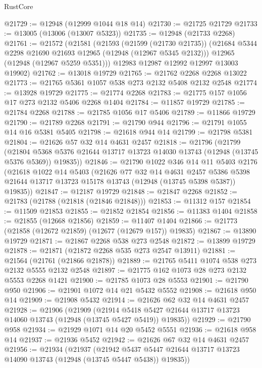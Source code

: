 \begin{lexlean}{RustCore}
\begin{coremodule}
@21729 := @12948 (@12999 @1044 @18 @14)
@21730 := @21725 @21729
@21733 := @13005 (@13006 (@13007 @5323))
@21735 := @12948 (@21733 @2268)
@21761 := @21572
    (@21581
      (@21593
        (@21599 (@21730 @21735))
        (@21684 @5344 @2298 @21690 @21693 @12965 (@12948 (@12967 @5345 @2132)))
        @12965
        (@12948 (@12967 @5259 @5351)))
      @12983
      @12987
      @12992
      @12997
      @13003
      @19902)
@21762 := @13018 @19729
@21765 := @21762 @2268 @2268 @13022
@21773 := @21765 @5361 @1057 @538 @273 @2132 @5408 @2132 @2548
@21774 := @13928 @19729
@21775 := @21774 @2268
@21783 := @21775 @157 @1056 @17 @273 @2132 @5406 @2268 @1404
@21784 := @11857 @19729
@21785 := @21784 @2268
@21788 := @21785 @1056 @17 @5406
@21789 := @11866 @19729
@21790 := @21789 @2268
@21791 := @21790 @944
@21796 := @21791 @1055 @14 @16 @5381 @5405
@21798 := @21618 @944 @14
@21799 := @21798 @5381
@21804 := @21626 @57 @32 @14 @4631 @2457
@21818 := @21796
    (@21799
      (@21804 @5368 @5376 @21644 @13717 @13723 @14030 @13743 (@12948 (@13745 @5376 @5369)) @19835))
@21846 := @21790
    @1022
    @346
    @14
    @11
    @5403
    @2176
    (@21618
      @1022
      @14
      @5403
      (@21626
        @77
        @32
        @14
        @4631
        @2457
        @5386
        @5398
        @21644
        @13717
        @13723
        @15178
        @13743
        (@12948 (@13745 @5398 @5387))
        @19835))
@21847 := @12187 @19729
@21848 := @21847 @2268
@21852 := @21783 (@21788 (@21818 (@21846 @21848)))
@21853 := @11312 @157
@21854 := @11509 @21853
@21855 := @21852 @21854
@21856 := @11383 @1404
@21858 := @21855 (@12668 @21856)
@21859 := @11407 @1404
@21866 := @21773 (@21858 (@12672 @21859) (@12677 (@12679 @157)) @19835)
@21867 := @13890 @19729
@21871 := @21867 @2268 @538 @273 @2548
@21872 := @13899 @19729
@21878 := @21871 (@21872 @2268 @535 @273 @2547 @13911)
@21881 := @21564 (@21761 (@21866 @21878))
@21889 := @21765 @5411 @1074 @538 @273 @2132 @5555 @2132 @2548
@21897 := @21775 @162 @1073 @28 @273 @2132 @5553 @2268 @1421
@21900 := @21785 @1073 @28 @5553
@21901 := @21790 @950
@21906 := @21901 @1072 @14 @21 @5432 @5552
@21908 := @21618 @950 @14
@21909 := @21908 @5432
@21914 := @21626 @62 @32 @14 @4631 @2457
@21928 := @21906
    (@21909
      (@21914 @5418 @5427 @21644 @13717 @13723 @14060 @13743 (@12948 (@13745 @5427 @5419)) @19835))
@21929 := @21790 @958
@21934 := @21929 @1071 @14 @20 @5452 @5551
@21936 := @21618 @958 @14
@21937 := @21936 @5452
@21942 := @21626 @67 @32 @14 @4631 @2457
@21956 := @21934
    (@21937
      (@21942 @5437 @5447 @21644 @13717 @13723 @14090 @13743 (@12948 (@13745 @5447 @5438)) @19835))

\end{coremodule}
\end{lexlean}
